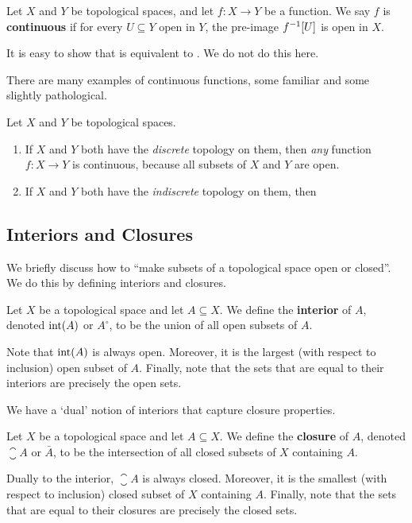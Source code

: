 \begin{boxdefinition}[Continuity]\label{Ch1:Def:Continuity_Topological}
    Let $X$ and $Y$ be topological spaces, and let $f : X \to Y$ be a function. We say $f$ is \textbf{continuous} if for every $U \subseteq Y$ open in $Y$, the pre-image $f^{-1}\!\left[ U \right]$ is open in $X$.
\end{boxdefinition}

It is easy to show that  is equivalent to . We do not do this here.

There are many examples of continuous functions, some familiar and some slightly pathological.

\begin{boxexample}
    Let $X$ and $Y$ be topological spaces.
    \begin{enumerate}
        \item If $X$ and $Y$ both have the \textit{discrete} topology on them, then \textit{any} function $f : X \to Y$ is continuous, because all subsets of $X$ and $Y$ are open.

        \item If $X$ and $Y$ both have the \textit{indiscrete} topology on them, then \sorry
    \end{enumerate}
\end{boxexample}

\subsection{Interiors and Closures}

We briefly discuss how to ``make subsets of a topological space open or closed''. We do this by defining interiors and closures.

\begin{boxdefinition}
    Let $X$ be a topological space and let $A \subseteq X$. We define the \textbf{interior} of $A$, denoted $\operatorname{int}\!\left( A \right)$ or $A^{\circ}$, to be the union of all open subsets of $A$.
\end{boxdefinition}

Note that $\operatorname{int}\!\left( A \right)$ is always open. Moreover, it is the largest (with respect to inclusion) open subset of $A$. Finally, note that the sets that are equal to their interiors are precisely the open sets.

We have a `dual' notion of interiors that capture closure properties.


\begin{boxdefinition}[Closure]
    Let $X$ be a topological space and let $A \subseteq X$. We define the \textbf{closure} of $A$, denoted $\closure{A}$ or $\bar{A}$, to be the intersection of all closed subsets of $X$ containing $A$.
\end{boxdefinition}

Dually to the interior, $\closure{A}$ is always closed. Moreover, it is the smallest (with respect to inclusion) closed subset of $X$ containing $A$. Finally, note that the sets that are equal to their closures are precisely the closed sets.